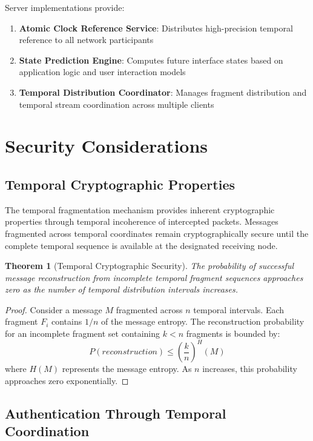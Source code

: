 \documentclass[12pt,a4paper]{article}
\newtheorem{theorem}{Theorem}
\begin{document}
Server implementations provide:

\begin{enumerate}
\item \textbf{Atomic Clock Reference Service}: Distributes high-precision temporal reference to all network participants
\item \textbf{State Prediction Engine}: Computes future interface states based on application logic and user interaction models
\item \textbf{Temporal Distribution Coordinator}: Manages fragment distribution and temporal stream coordination across multiple clients
\end{enumerate}

\section{Security Considerations}

\subsection{Temporal Cryptographic Properties}

The temporal fragmentation mechanism provides inherent cryptographic properties through temporal incoherence of intercepted packets. Messages fragmented across temporal coordinates remain cryptographically secure until the complete temporal sequence is available at the designated receiving node.

\begin{theorem}[Temporal Cryptographic Security]
The probability of successful message reconstruction from incomplete temporal fragment sequences approaches zero as the number of temporal distribution intervals increases.
\end{theorem}

\begin{proof}
Consider a message $M$ fragmented across $n$ temporal intervals. Each fragment $F_i$ contains $1/n$ of the message entropy. The reconstruction probability for an incomplete fragment set containing $k < n$ fragments is bounded by:
\begin{equation}
P(reconstruction) \leq \left(\frac{k}{n}\right)^H(M)
\end{equation}
where $H(M)$ represents the message entropy. As $n$ increases, this probability approaches zero exponentially.
\end{proof}

\subsection{Authentication Through Temporal Coordination}
\end{document}
